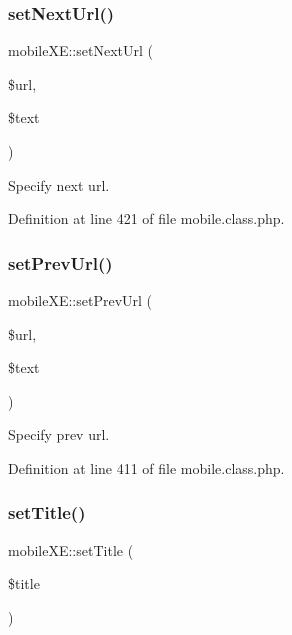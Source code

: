 \subsubsection{\texorpdfstring{set\+Next\+Url()}{setNextUrl()}}
{\footnotesize\ttfamily mobile\+X\+E\+::set\+Next\+Url (\begin{DoxyParamCaption}\item[{}]{\$url,  }\item[{}]{\$text }\end{DoxyParamCaption})}



Specify next url. 



Definition at line 421 of file mobile.\+class.\+php.

\mbox{\label{classmobileXE_ad5d56a0b6158ecf599359ca2f1356f16}} 
\subsubsection{\texorpdfstring{set\+Prev\+Url()}{setPrevUrl()}}
{\footnotesize\ttfamily mobile\+X\+E\+::set\+Prev\+Url (\begin{DoxyParamCaption}\item[{}]{\$url,  }\item[{}]{\$text }\end{DoxyParamCaption})}



Specify prev url. 



Definition at line 411 of file mobile.\+class.\+php.

\mbox{\label{classmobileXE_a6ae064d89d2b926d7c96f59257692a01}} 
\subsubsection{\texorpdfstring{set\+Title()}{setTitle()}}
{\footnotesize\ttfamily mobile\+X\+E\+::set\+Title (\begin{DoxyParamCaption}\item[{}]{\$title }\end{DoxyParamCaption})}



